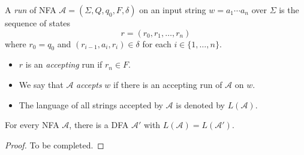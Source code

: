 \begin{definition}\label{def:nfa-run}
  A \emph{run} of NFA $\mathcal{A} = (\Sigma, Q, q_0, F, \delta)$ on an input
  string $w = a_1 \cdots a_n$ over $\Sigma$ is the sequence of states
  \begin{equation*}
    r = (r_0, r_1, \dots, r_n)
  \end{equation*}
  where $r_0 = q_0$ and $(r_{i-1}, a_i, r_i) \in \delta$ for each
  $i \in \{1, \dots, n\}$.
  \begin{itemize}
    \item $r$ is an \emph{accepting} run if $r_n \in F$.
    \item We say that $\mathcal{A}$ \emph{accepts} $w$ if there is an accepting
      run of $\mathcal{A}$ on $w$.
    \item The language of all strings accepted by $\mathcal{A}$ is denoted by
      $L(\mathcal{A})$.
  \end{itemize}
\end{definition}

\begin{theorem}\label{thm:dfa-nfa-equivalence}
  For every NFA $\mathcal{A}$, there is a DFA $\mathcal{A}'$ with
  $L(\mathcal{A}) = L(\mathcal{A}')$.
\end{theorem}
\begin{proof}
  To be completed.
\end{proof}